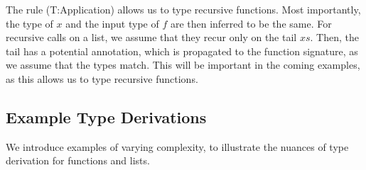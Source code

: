 The rule (T:Application) allows us to type recursive functions. Most importantly, the type of \(x\) and the input type of \(f\) are then inferred to be the same. For recursive calls on a list, we assume that they recur only on the tail \(xs\). Then, the tail has a potential annotation, which is propagated to the function signature, as we assume that the types match. This will be important in the coming examples, as this allows us to type recursive functions.

\subsection{Example Type Derivations}\label{sec:example-type-derivations}

We introduce examples of varying complexity, to illustrate the nuances of type derivation for functions and lists. 

